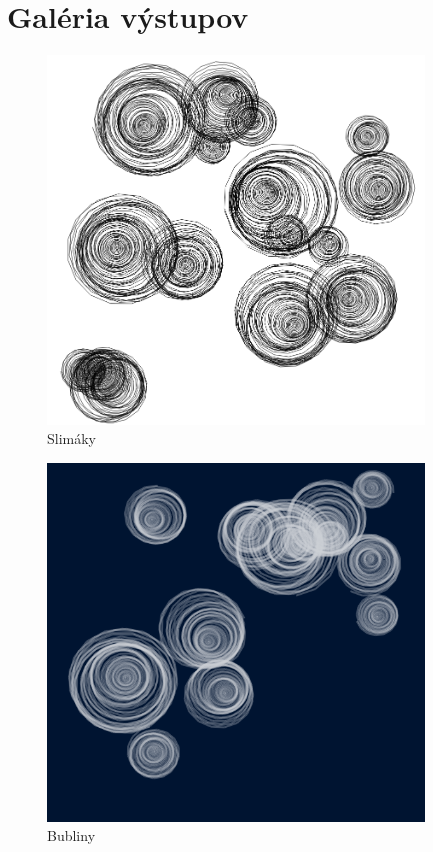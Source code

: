 \documentclass[11pt,a4paper]{article}
\begin{document}
\section{Galéria výstupov}

\FloatBarrier

\begin{figure}[!h]
  \centering
  \includegraphics[width=10cm]{images/snails.png}
  \caption{Slimáky}
\end{figure}

\begin{figure}[!h]
  \centering
  \includegraphics[width=10cm]{images/bubbles.png}
  \caption{Bubliny}
\end{figure}
\end{document}
